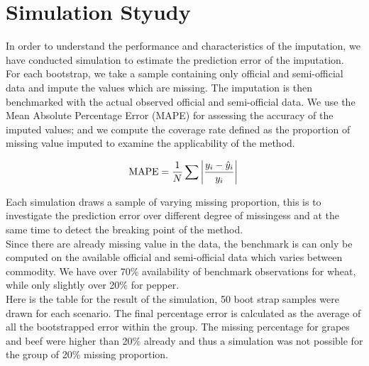 \documentclass[nojss]{jss}\usepackage[]{graphicx}\usepackage[]{color}
\begin{document}
\FloatBarrier
\section{Simulation Styudy}

In order to understand the performance and characteristics of the
imputation, we have conducted simulation to estimate the prediction
error of the imputation.\\

For each bootstrap, we take a sample containing only official and
semi-official data and impute the values which are missing. The
imputation is then benchmarked with the actual observed official and
semi-official data. We use the Mean Absolute Percentage Error (MAPE)
for assessing the accuracy of the imputed values; and we compute the
coverage rate defined as the proportion of missing value imputed to
examine the applicability of the method.

\begin{equation}
  \text{MAPE} = \frac{1}{N} \sum \left|\frac{y_i -
    \hat{y}_i}{y_i}\right|\\
\end{equation}


Each simulation draws a sample of varying missing proportion, this is
to investigate the prediction error over different degree of
missingess and at the same time to detect the breaking point of the
method.\\

Since there are already missing value in the data, the benchmark is
can only be computed on the available official and semi-official data
which varies between commodity. We have over 70\% availability of
benchmark observations for wheat, while only slightly over 20\% for
pepper.\\


Here is the table for the result of the simulation, 50 boot strap
samples were drawn for each scenario. The final percentage error is
calculated as the average of all the bootstrapped error within the
group. The missing percentage for grapes and beef were higher than
20\% already and thus a simulation was not possible for the group of
20\% missing proportion.
\end{document}
